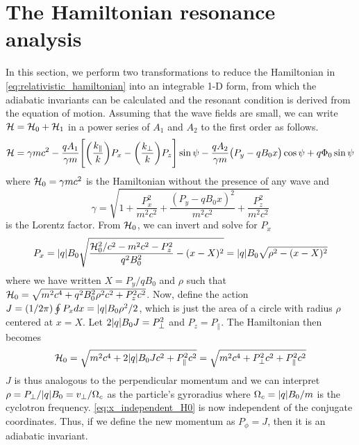 \section{The Hamiltonian resonance
analysis}\label{sec:hamiltonian_analysis}

In this section, we perform two transformations to reduce the Hamiltonian in
\cref{eq:relativistic_hamiltonian} into an integrable 1-D form, from which the
adiabatic invariants can be calculated and the resonant condition is derived
from the equation of motion. Assuming that the wave fields are small, we can
write $\mathcal{H}=\mathcal{H}_0+\mathcal{H}_1$ in a power series of $A_1$ and $A_2$ to the first order
as follows. \begin{equation}\label{eq:Hamiltonian_original_form} \mathcal{H}= \gamma
mc^2 -\frac{qA_1}{\gamma m}\qty[\qty(\frac{k_\parallel}{k})P_x-\qty(\frac{k_\bot}{k})P_z]\sin\psi -\frac{qA_2}{\gamma m}\qty(P_y-qB_0x)\cos\psi +q\Phi_0\sin\psi \end{equation}
where $\mathcal{H}_0=\gamma mc^2$ is the Hamiltonian without the presence of any wave
and
\begin{equation}
    \gamma=\sqrt{ 1 +\frac{P_x^2}{m^2c^2}
        +\frac{(P_y-qB_0x)^2}{m^2c^2} +\frac{P_z^2}{m^2c^2} }
\end{equation}
is the Lorentz factor. From $\mathcal{H}_0$, we can invert and
solve for $P_x$ \begin{equation}\label{eq:simplified_px}
P_x=\abs{q}B_0\sqrt{\frac{\mathcal{H}_0^2/c^2-m^2c^2-P_z^2}{q^2B_0^2}-(x-X)^2}
=\abs{q}B_0\sqrt{\rho^2-(x-X)^2}
\end{equation}
where we have written
$X=P_y/qB_0$ and $\rho$ such that
$\mathcal{H}_0=\sqrt{m^2c^4+q^2B_0^2\rho^2c^2+P_z^2c^2}$. Now, define the action
$J=(1/2\pi)\oint P_xdx=\abs{q}B_0\rho^2/2$,
which is just the area of a circle with radius
$\rho$ centered at $x=X$. Let $2\abs{q}B_0J=P_\perp^2$ and
$P_z=P_\parallel$.  The Hamiltonian then becomes
\begin{equation}\label{eq:x_independent_H0}
\mathcal{H}_0=\sqrt{m^2c^4+2\abs{q}B_0Jc^2+P_\parallel^2c^2}=\sqrt{m^2c^4+P_\bot^2c^2+P_\parallel^2c^2}
\end{equation} $J$ is thus analogous to the perpendicular momentum and we can
interpret $\rho=P_\perp/\abs{q}B_0=v_\perp/\Omega_{c}$ as the particle's
gyroradius where $\Omega_c=\abs{q}B_0/m$ is the cyclotron frequency. \cref{eq:x_independent_H0} is now independent of the conjugate
coordinates. Thus, if we define the new momentum as $P_\phi=J$, then it is an
adiabatic invariant.

